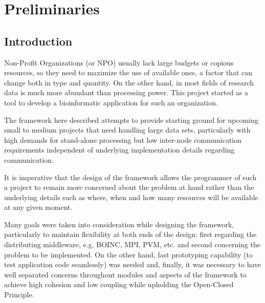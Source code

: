 \documentclass[a4paper,12pt,english]{report}
\begin{document}


\newpage

\tableofcontents

\newpage

\listoffigures

\newpage

\listoftables

\newpage


\part{Preliminaries}\label{prelim}

\chapter{Introduction}


Non-Profit Organizations (or NPO) usually lack large budgets or copious resources, so they need to maximize the use of available ones, a factor that can change both in type and quantity. On the other hand, in most fields of research data is much more abundant than processing power. This project started as a tool to develop a bioinformatic application for such an organization.

The framework here described attempts to provide starting ground for upcoming small to medium projects that need handling large data sets, particularly with high demands for stand-alone processing but low inter-node communication requirements independent of underlying implementation details regarding communication. 

It is imperative that the design of the framework allows the programmer of such a project to remain more concerned about the problem at hand rather than the underlying details such as where, when and how many resources will be available at any given moment.


Many goals were taken into consideration while designing the framework, particularly to maintain flexibility at both ends of the design: first regarding the distributing middleware, e.g. BOINC, MPI, PVM, etc. and second concerning the problem to be implemented. On the other hand, fast prototyping capability (to test application code seamlessly) was needed and, finally, it was necessary to have well separated concerns throughout modules and aspects of the framework to achieve high cohesion and low coupling while upholding the Open-Closed Principle\cite{oosc}.
\end{document}
